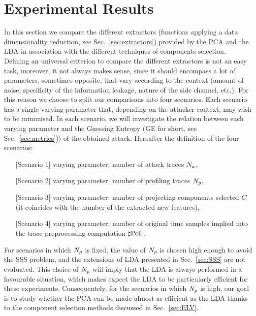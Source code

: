 

\section{Experimental Results}\label{sec:experiments}

In this section we compare the different extractors (\ie functions applying a data dimensionality reduction, see Sec.~\ref{sec:extractors}) provided by the PCA and the LDA in association with the different techniques  of components selection. Defining an universal criterion to compare the different extractors is not an easy task, moreover, it not always makes sense, since it should encompass a lot of parameters, sometimes opposite, that vary according to the context (amount of noise, specificity of the information leakage, nature of the side channel, etc.). For this reason we choose to split our comparisons into four scenarios. Each scenario has a single varying parameter that, depending on the attacker context, may wish to be minimised. In each scenario, we will investigate the relation between each varying parameter and the Guessing Entropy (GE for short, see Sec.~\ref{sec:metrics})) of the obtained attack. Hereafter the definition of the four scenarios: 
\begin{itemize}
\item[][Scenario 1] varying parameter: number of attack traces $N_a$, 
\item[][Scenario 2] varying parameter: number of profiling traces $N_p$, 
\item[][Scenario 3] varying parameter: number of projecting components selected $C$ (it coincides with the number of the extracted new features),
\item[][Scenario 4] varying parameter: number of original time samples implied into the trace preprocessing computation $\sharp\mathrm{PoI}$ .
\end{itemize}
 
For scenarios in which $N_p$ is fixed, the value of $N_p$ is chosen high enough to avoid the SSS problem, and the extensions of LDA presented in Sec.~\ref{sec:SSS} are not evaluated.
 This choice of $N_p$ will imply that the LDA is always performed in a favourable situation, which makes expect the LDA to be particularly efficient for these experiments. Consequentely, for the scenarios in which $N_p$ is high, our goal is to study whether the PCA can be made almost as efficient as the LDA thanks to the component selection methods discussed in Sec.~\ref{sec:ELV}. 




